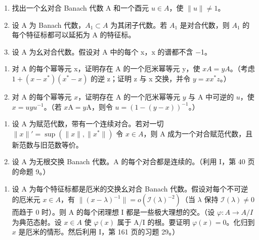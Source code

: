 
\begin{enumerate}
\def\labelenumi{\arabic{enumi})}
\item
  找出一个幺对合 Banach 代数 A 和一个酉元 \(u \in A\)，使 \(\|u\| \neq 1\)。
\item
  设 A 为 Banach 代数，\(A_{1} \subset A\) 为其闭子代数。若 \(A_{1}\) 是对合代数，则 \(A_{1}\) 的每个特征标都可以延拓为 A 的特征标。
\item
  设 A 为幺对合代数。假设对 A 中的每个 x，x 的谱都不含 −1。
\end{enumerate}

\begin{enumerate}
\def\labelenumi{\alph{enumi})}
\item
  对 A 的每个幂等元 x，证明存在 A 的一个厄米幂等元 y，使 \(xA = yA\)。（考虑 \(1 + (x - x^{*})(x^{*} - x)\) 的逆 z；证明 z 与 x 交换，并令 \(y = xx^{*}z\)。）
\item
  对 A 的每个幂等元 \(x\)，证明存在 A 的一个厄米幂等元 \(y\) 与 A 中可逆的 \(u\)，使 \(x = uyu^{-1}\)。（若 \(x\mathrm{A} = y\mathrm{A}\)，则令 \(u = (1 - (y - x))^{-1}\)。）
\end{enumerate}

\begin{enumerate}
\def\labelenumi{\arabic{enumi})}
\setcounter{enumi}{3}
\item
  设 A 为赋范代数，带有一个连续对合。若对一切 \(\|x\|' = \sup(\|x\|, \|x^{*}\|)\) 令 \(x \in A\)，则 A 成为一个对合赋范代数，且新范数与旧范数等价。
\item
  设 A 为无根交换 Banach 代数。A 的每个对合都是连续的。（利用 I，第 40 页的命题 9。）
\end{enumerate}

\begin{enumerate}
\def\labelenumi{¶ \arabic{enumi})}
\setcounter{enumi}{5}
\tightlist
\item
  设 A 为每个特征标都是厄米的交换幺对合 Banach 代数。假设对每个不可逆的厄米元 \(x \in A\)，有 \(\|(x - \lambda)^{-1}\| = o(\mathcal{I}(\lambda)^{-2})\)（当 \(\lambda\) 保持 \(\mathcal{I}(\lambda) \neq 0\) 而趋于 0 时）。则 A 的每个闭理想 I 都是一些极大理想的交。（设 \(\varphi: A \longrightarrow A/I\) 为典范态射。设 \(x \in A\) 使 \(\varphi(x)\) 属于 A/I 的根。要证明 \(\varphi(x) = 0\)。化归到 \(x\) 是厄米的情形。然后利用 I，第 161 页的习题 29。）
\end{enumerate}

